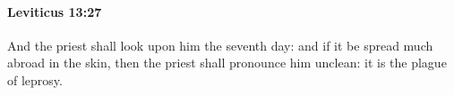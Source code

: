 
		\paragraph{Leviticus 13:27} %
			\label{LEVITICUS-13-27}

			And the priest shall look upon him the seventh day: and if it be spread much abroad in the skin, then the priest shall pronounce him unclean: it is the plague of leprosy.


